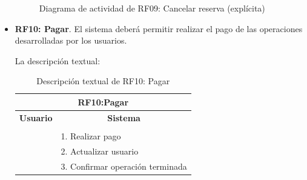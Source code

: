 \begin{itemize}
	\begin{figure}[!htb]
		\centering
		\caption{Diagrama de actividad de RF09: Cancelar reserva (explícita)}
		\label{fig:diagramaActividad_RF09}
	\end{figure}
	
	\FloatBarrier
	\item \textbf{RF10: Pagar}. El sistema deberá permitir realizar el pago de las operaciones desarrolladas por los usuarios.
	
	La descripción textual:
	
	\begin{table}[h]
		\centering	
		\begin{tabular}{|l|l|}
			\hline
			\multicolumn{2}{|c|}{\textbf{RF10:Pagar}} \\ \hline
			\multicolumn{1}{|c|}{\textbf{Usuario}} & \multicolumn{1}{c|}{\textbf{Sistema}} \\ \hline
			[Pto. inclusión: RF06: Coger bicicleta] &\\ \hline
			& 1. Realizar pago \\ \hline 
			& 2. Actualizar usuario \\ \hline 
			& 3. Confirmar operación terminada \\ \hline 	
		\end{tabular}
		\caption{Descripción textual de RF10: Pagar}
		\label{tab:tablaDescTextualRF10}
	\end{table}
	

\end{itemize}
